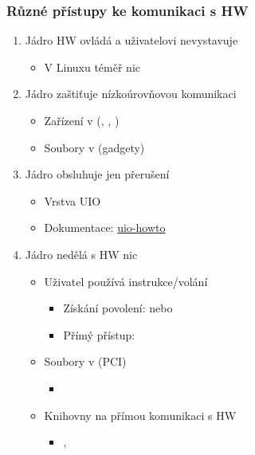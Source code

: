 \begin{frame}
  \frametitle{Různé přístupy ke komunikaci s HW}

  \begin{enumerate}
    \item Jádro HW ovládá a uživatelovi nevystavuje
    \begin{itemize}
      \item V Linuxu téměř nic
    \end{itemize}

    \pause

    \item Jádro zaštiťuje nízkoúrovňovou komunikaci
    \begin{itemize}
      \item Zařízení v  (, , )
      \item Soubory v  (gadgety)
    \end{itemize}

    \pause

    \item Jádro obsluhuje jen přerušení
    \begin{itemize}
      \item Vrstva UIO
      \item Dokumentace: \href{http://blackfin.uclinux.org/doku.php?id=auto_generated_kernel_docs:uio-howto}{uio-howto}
    \end{itemize}

    \pause

    \item Jádro nedělá s HW nic
    \begin{itemize}
      \item Uživatel používá instrukce/volání
      \begin{itemize}
	\item Získání povolení:  nebo 
	\item Přímý přístup: 
      \end{itemize}

      \item Soubory v  (PCI)
      \begin{itemize}
	\item {}
      \end{itemize}

      \item Knihovny na přímou komunikaci s HW
      \begin{itemize}
	\item {}, 
      \end{itemize}
    \end{itemize}
  \end{enumerate}

\end{frame}

